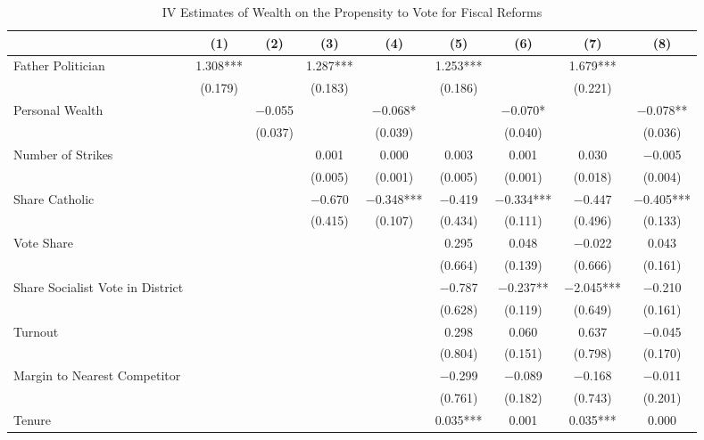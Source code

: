 \begin{table}

\caption{\label{tab:ivresults}IV Estimates of Wealth on the Propensity to Vote for Fiscal Reforms}
\centering
\begin{tabular}[t]{lcccccccc}
\toprule
  & (1) & (2) & (3) & (4) & (5) & (6) & (7) & (8)\\
\midrule
Father Politician & \num{1.308}*** &  & \num{1.287}*** &  & \num{1.253}*** &  & \num{1.679}*** & \\
 & (\num{0.179}) &  & (\num{0.183}) &  & (\num{0.186}) &  & (\num{0.221}) & \\
Personal Wealth &  & \num{-0.055} &  & \num{-0.068}* &  & \num{-0.070}* &  & \num{-0.078}**\\
 &  & (\num{0.037}) &  & (\num{0.039}) &  & (\num{0.040}) &  & (\num{0.036})\\
Number of Strikes &  &  & \num{0.001} & \num{0.000} & \num{0.003} & \num{0.001} & \num{0.030} & \num{-0.005}\\
 &  &  & (\num{0.005}) & (\num{0.001}) & (\num{0.005}) & (\num{0.001}) & (\num{0.018}) & (\num{0.004})\\
Share Catholic &  &  & \num{-0.670} & \num{-0.348}*** & \num{-0.419} & \num{-0.334}*** & \num{-0.447} & \num{-0.405}***\\
 &  &  & (\num{0.415}) & (\num{0.107}) & (\num{0.434}) & (\num{0.111}) & (\num{0.496}) & (\num{0.133})\\
Vote Share &  &  &  &  & \num{0.295} & \num{0.048} & \num{-0.022} & \num{0.043}\\
 &  &  &  &  & (\num{0.664}) & (\num{0.139}) & (\num{0.666}) & (\num{0.161})\\
Share Socialist Vote in District &  &  &  &  & \num{-0.787} & \num{-0.237}** & \num{-2.045}*** & \num{-0.210}\\
 &  &  &  &  & (\num{0.628}) & (\num{0.119}) & (\num{0.649}) & (\num{0.161})\\
Turnout &  &  &  &  & \num{0.298} & \num{0.060} & \num{0.637} & \num{-0.045}\\
 &  &  &  &  & (\num{0.804}) & (\num{0.151}) & (\num{0.798}) & (\num{0.170})\\
Margin to Nearest Competitor &  &  &  &  & \num{-0.299} & \num{-0.089} & \num{-0.168} & \num{-0.011}\\
 &  &  &  &  & (\num{0.761}) & (\num{0.182}) & (\num{0.743}) & (\num{0.201})\\
Tenure &  &  &  &  & \num{0.035}*** & \num{0.001} & \num{0.035}*** & \num{0.000}\\

\end{tabular}
\end{table}
